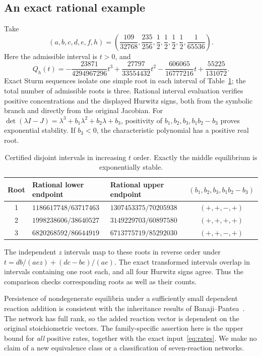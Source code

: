 \documentclass[11pt,a4paper]{article}
\begin{document}
\subsection{An exact rational example}
Take
\begin{equation}\label{eq:rates}
 (a,b,c,d,e,f,h)=
 \left(\frac{109}{32768},\frac{235}{256},\frac12,\frac12,
       \frac12,\frac12,\frac1{65536}\right).
\end{equation}
Here the admissible interval is $t>0$, and
\[
 Q_h(t)=-\frac{23871}{4294967296}t^3
        +\frac{27797}{33554432}t^2
        -\frac{606065}{16777216}t+\frac{55225}{131072}.
\]
Exact Sturm sequences isolate one simple root in each interval
of Table~\ref{tab:roots}; the total number of admissible roots
is three. Rational interval evaluation verifies positive
concentrations and the displayed Hurwitz signs, both from
the symbolic branch and directly from the original Jacobian.
For $\det(\lambda I-J)=\lambda^3+b_1\lambda^2+b_2\lambda+b_3$,
positivity of $b_1,b_2,b_3,b_1b_2-b_3$ proves exponential stability.
If $b_3<0$, the characteristic polynomial has a positive real root.

\begin{table}[ht]
\centering\small
\begin{tabular}{@{}cllc@{}}
\toprule
Root & Rational lower endpoint & Rational upper endpoint &
$(b_1,b_2,b_3,b_1b_2-b_3)$\\
\midrule
1 & $1186617748/63717463$ & $1307453375/70205938$ & $(+,+,-,+)$\\
2 & $1998238606/38640527$ & $3149229703/60897580$ & $(+,+,+,+)$\\
3 & $6820268592/86644919$ & $6713775719/85292030$ & $(+,+,-,+)$\\
\bottomrule
\end{tabular}
\caption{Certified disjoint intervals in increasing $t$ order.
Exactly the middle equilibrium is exponentially stable.}
\label{tab:roots}
\end{table}

The independent $z$ intervals map to these roots in reverse order
under $t=db/(ae z)+(dc-be)/(ae)$. The exact transformed intervals
overlap in intervals containing one root each, and all four
Hurwitz signs agree. Thus the comparison checks corresponding
roots as well as their counts.

Persistence of nondegenerate equilibria under a sufficiently
small dependent reaction addition is consistent with the
inheritance results of Banaji--Pantea~\cite{BP}. The network has
full rank, so the added reaction vector is dependent on the
original stoichiometric vectors. The family-specific assertion
here is the upper bound for \emph{all} positive rates, together
with the exact input~\eqref{eq:rates}. We make no claim of a new
equivalence class or a classification of seven-reaction networks.
\end{document}
